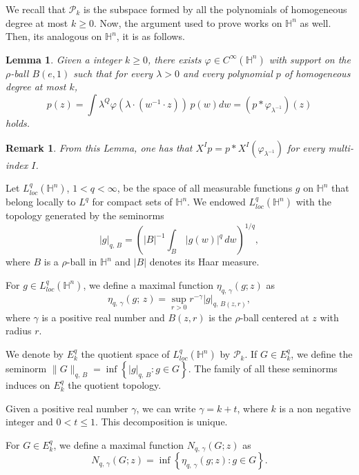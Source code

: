\documentclass[oneside,10pt]{article}
\newtheorem{lemma}[theorem]{Lemma}
\newtheorem{remark}[theorem]{Remark}
\begin{document}
We recall that $\mathcal{P}_{k}$ is the subspace formed by all the polynomials of homogeneous degree at most $k \geq 0$. Now, the argument used to prove \cite[Lemma 2.6]{Zygm} works on $\mathbb{H}^n$ as well. Then, its analogous on $\mathbb{H}^n$, it is as follows.

\begin{lemma} \label{ident pol}
Given a integer $k \geq 0$, there exists $\varphi \in C^{\infty}(\mathbb{H}^n)$ with support on the $\rho$-ball $B(e,1)$ such that for every 
$\lambda > 0$ and every polynomial $p$ of homogeneous degree at most $k$,
\[
p(z) = \int \lambda^{Q} \varphi(\lambda \cdot (w^{-1} \cdot z)) \, p(w) dw =  (p \ast \varphi_{\lambda^{-1}})(z)
\]
holds.
\end{lemma}

\begin{remark} \label{der pol}
From this Lemma, one has that $X^{I}p = p \ast X^{I}(\varphi_{\lambda^{-1}})$ for every multi-index $I$.
\end{remark}


Let $L^{q}_{loc}(\mathbb{H}^{n})$, $1 < q < \infty$, be the space of all measurable functions $g$ on $\mathbb{H}^{n}$ that belong locally 
to $L^{q}$ for compact sets of $\mathbb{H}^{n}$. We endowed $L^{q}_{loc}(\mathbb{H}^{n})$ with the topology generated by the seminorms
\[
|g|_{q, \, B} = \left( |B|^{-1} \int_{B} \, |g(w)|^{q}\, dw \right)^{1/q},
\]
where $B$ is a $\rho$-ball in $\mathbb{H}^{n}$ and $|B|$ denotes its Haar measure.

For $g \in L^{q}_{loc}(\mathbb{H}^{n})$, we define a maximal function $\eta_{q, \, \gamma}(g; z)$ as
\[
\eta_{q, \, \gamma}(g; \, z) = \sup_{r > 0} r^{-\gamma} |g|_{q, \, B(z, r)},
\]
where $\gamma$ is a positive real number and $B(z, r)$ is the $\rho$-ball centered at $z$ with radius $r$.

We denote by $E^{q}_{k}$ the quotient space of $L^{q}_{loc}(\mathbb{H}^{n})$ by $\mathcal{P}_{k}$. If 
$G \in E^{q}_{k}$, we define the seminorm $\| G \|_{q, \, B} = \inf \left\{ |g|_{q, \, B} : g \in G \right\}$. The family of all these seminorms induces on $E^{q}_{k}$ the quotient topology.

Given a positive real number $\gamma$, we can write $\gamma = k + t$, where $k$ is a non negative integer and $0 < t \leq 1$. This decomposition is unique.

For $G \in E^{q}_{k}$, we define a maximal function $N_{q, \, \gamma}(G; z)$ as 
\[
N_{q, \, \gamma}(G; z) = \inf \left\{ \eta_{q, \, \gamma}(g; z) : g \in G \right\}.
\]
\end{document}
